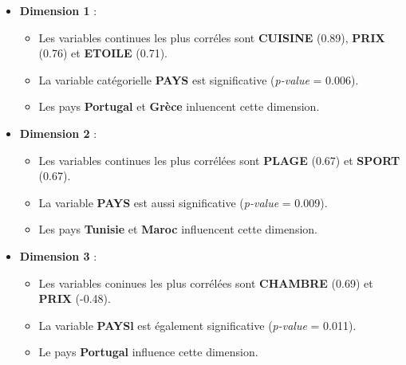 \documentclass{article}
\begin{document}
    \begin{itemize}
        \item \textbf{Dimension 1} :
        \begin{itemize}
            \item Les variables continues les plus corréles sont \textbf{CUISINE} (0.89), \textbf{PRIX} (0.76) et \textbf{ETOILE} (0.71).
            \item La variable catégorielle \textbf{PAYS} est significative (\textit{p-value} = 0.006).
            \item Les pays \textbf{Portugal} et \textbf{Grèce} inluencent cette dimension.
        \end{itemize}

        \item \textbf{Dimension 2} :
        \begin{itemize}
            \item Les variables continues les plus corrélées sont \textbf{PLAGE} (0.67) et \textbf{SPORT} (0.67).
            \item La variable \textbf{PAYS} est aussi significative (\textit{p-value} = 0.009).
            \item Les pays \textbf{Tunisie} et \textbf{Maroc} influencent cette dimension.
        \end{itemize}

        \item \textbf{Dimension 3} :
        \begin{itemize}
            \item Les variables coninues les plus corrélées sont \textbf{CHAMBRE} (0.69) et \textbf{PRIX} (-0.48).
            \item La variable \textbf{PAYSl} est également significative (\textit{p-value} = 0.011).
            \item Le pays \textbf{Portugal} influence cette dimension.
        \end{itemize}
    \end{itemize}
\end{document}
